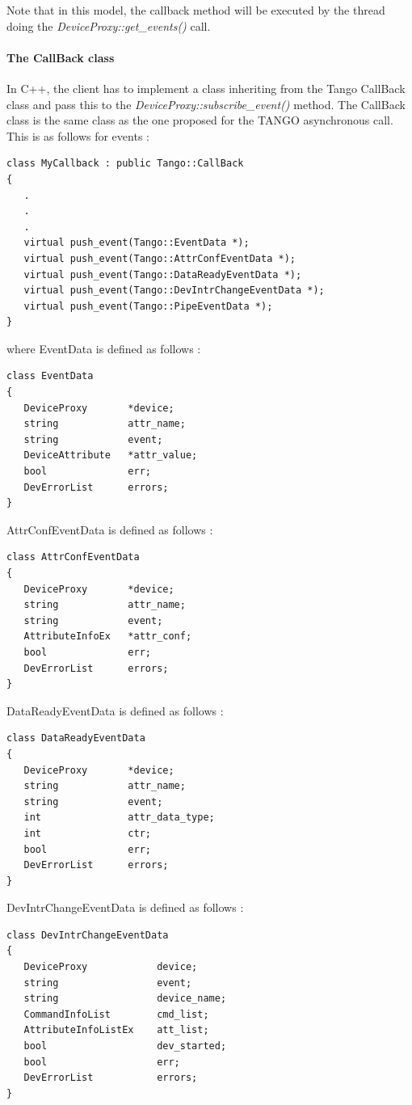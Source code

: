 Note that in this model, the callback method will be executed by the
thread doing the \emph{DeviceProxy::get\_events()} call.


\paragraph{The CallBack class}

In C++, the client has to implement a class inheriting from the Tango
CallBack class and pass this to the \emph{DeviceProxy::subscribe\_event()}
method. The CallBack class is the same class as the one proposed for
the TANGO asynchronous call. This is as follows for events :
\begin{verbatim}
class MyCallback : public Tango::CallBack
{
   .
   .
   .
   virtual push_event(Tango::EventData *);
   virtual push_event(Tango::AttrConfEventData *);
   virtual push_event(Tango::DataReadyEventData *);
   virtual push_event(Tango::DevIntrChangeEventData *);
   virtual push_event(Tango::PipeEventData *);
}
\end{verbatim}
where EventData is defined as follows :
\begin{verbatim}
class EventData 
{
   DeviceProxy       *device;
   string            attr_name;
   string            event;
   DeviceAttribute   *attr_value;
   bool              err;
   DevErrorList      errors;
}
\end{verbatim}
AttrConfEventData is defined as follows
:
\begin{verbatim}
class AttrConfEventData 
{
   DeviceProxy       *device;
   string            attr_name;
   string            event;
   AttributeInfoEx   *attr_conf;
   bool              err;
   DevErrorList      errors;
}
\end{verbatim}
DataReadyEventData is defined as follows
:
\begin{verbatim}
class DataReadyEventData 
{
   DeviceProxy       *device;
   string            attr_name;
   string            event;
   int               attr_data_type;
   int               ctr;
   bool              err;
   DevErrorList      errors;
}
\end{verbatim}
DevIntrChangeEventData is defined as
follows :
\begin{verbatim}
class DevIntrChangeEventData 
{
   DeviceProxy            device;
   string                 event;
   string                 device_name;
   CommandInfoList        cmd_list;
   AttributeInfoListEx    att_list;
   bool                   dev_started;
   bool                   err;
   DevErrorList           errors;
}
\end{verbatim}
